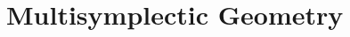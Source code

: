 \documentclass[10pt]{beamer}
\begin{document}
    
    \section{Multisymplectic Geometry}
    \checkpoint
    
\end{document}
